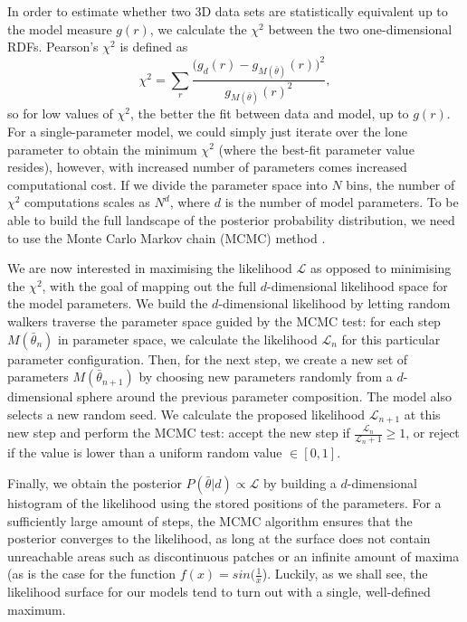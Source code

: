 \documentclass[aps,pre,twocolumn,letterpaper,floatfix,showpacs]{revtex4}
\begin{document}
In order to estimate whether two 3D data sets are statistically equivalent up to
the model measure $g(r)$, we calculate the $\chi^2$ between the two one-dimensional
RDFs. Pearson's $\chi^2$ is defined as 
\begin{equation}
  \chi^2 = \sum_r \frac{ \Big(g_d(r) - g_{M(\bar \theta)}(r) \Big)^2}{g_{M(\bar \theta)}(r)^2},
\end{equation}
so for low values of $\chi^2$, the better the fit between data and model, up to
$g(r)$. For a single-parameter model, we could simply just iterate over the lone
parameter to obtain the minimum $\chi^2$ (where the best-fit parameter value resides),
however, with increased number of parameters comes increased computational cost.
If we divide the parameter space into $N$ bins, the number of $\chi^2$ computations
scales as $N^d$, where $d$ is the number of model parameters. To be able to build
the full landscape of the posterior probability distribution, we need to use the Monte Carlo Markov chain (MCMC) method .

We are now interested in maximising the likelihood $\mathcal L$ as opposed to
minimising the $\chi^2$, with the goal of mapping out the full $d$-dimensional
likelihood space for the model parameters. We build the $d$-dimensional likelihood
by letting random walkers traverse the parameter space guided by the MCMC test:
for each step $M(\bar \theta_{n})$ in parameter space, we calculate the likelihood
$\mathcal L_n$ for this particular parameter configuration. Then, for the next
step, we create a new set of parameters $M(\bar \theta_{n+1})$ by choosing new
parameters randomly from a $d$-dimensional sphere around the previous parameter
composition. The model also selects a new random seed. We calculate the proposed
likelihood $\mathcal L_{n+1}$ at this new step and perform the MCMC test: accept
the new step if $\frac{\mathcal L_n}{\mathcal L_n+1} \ge 1$, or reject if the value
is lower than a uniform random value $\in [0,1]$. 

Finally, we obtain the posterior $P(\bar \theta | d) \propto \mathcal L$ by building
a $d$-dimensional histogram of the likelihood using the stored positions of the parameters.
For a sufficiently large amount of steps, the MCMC algorithm ensures that the posterior
converges to the likelihood, as long at the surface does not contain unreachable areas
such as discontinuous patches or an infinite amount of maxima (as is the case for the
function $f(x)=sin(\frac{1}{x}$). Luckily, as we shall see, the likelihood surface for
our models tend to turn out with a single, well-defined maximum.  
\end{document}
